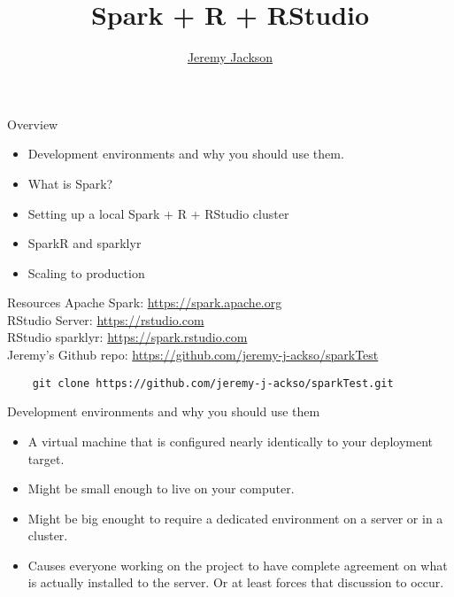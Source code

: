 \documentclass[pdf]{beamer}
\title{Spark + R + RStudio}
\author{\href{mailto:jeremy_j@ackso.net}{Jeremy Jackson}}
\begin{document}
\begin{frame}
	\titlepage
\end{frame}


\begin{frame}{Overview}
    \begin{itemize}
	\item Development environments and why you should use them.
	\item What is Spark?
	\item Setting up a local Spark + R + RStudio cluster
	\item SparkR and sparklyr 
	\item Scaling to production
    \end{itemize}
\end{frame}

\begin{frame}[fragile]{Resources}
    Apache Spark: \url{https://spark.apache.org}\\
    RStudio Server: \url{https://rstudio.com}\\
    RStudio sparklyr: \url{https://spark.rstudio.com}\\
    Jeremy's Github repo: \url{https://github.com/jeremy-j-ackso/sparkTest}\\

    \begin{verbatim}
	git clone https://github.com/jeremy-j-ackso/sparkTest.git
    \end{verbatim}
\end{frame}

\begin{frame}{Development environments and why you should use them}
    \begin{itemize}
	\item A virtual machine that is configured nearly identically to your deployment target.
	\item Might be small enough to live on your computer.
	\item Might be big enought to require a dedicated environment on a server or in a cluster.
	\item Causes everyone working on the project to have complete agreement on what is actually installed to the server. Or at least forces that discussion to occur.
    \end{itemize}
\end{frame}
\end{document}
